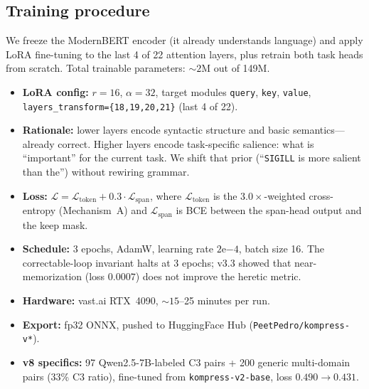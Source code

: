 \subsection{Training procedure}
\label{sec:train}

We freeze the ModernBERT encoder (it already understands language) and
apply LoRA fine-tuning to the last 4 of 22 attention layers, plus retrain
both task heads from scratch. Total trainable parameters: ${\sim}2$M out of
149M.

\begin{itemize}
  \item \textbf{LoRA config:} $r{=}16$, $\alpha{=}32$, target modules
        \texttt{query}, \texttt{key}, \texttt{value},
        \texttt{layers\_transform=\{18,19,20,21\}} (last 4 of 22).
  \item \textbf{Rationale:} lower layers encode syntactic structure and basic
        semantics---already correct. Higher layers encode task-specific
        salience: what is ``important'' for the current task. We shift that
        prior (``\texttt{SIGILL} is more salient than the'') without rewiring
        grammar.
  \item \textbf{Loss:} $\mathcal{L} = \mathcal{L}_{\mathrm{token}} + 0.3
        \cdot \mathcal{L}_{\mathrm{span}}$, where
        $\mathcal{L}_{\mathrm{token}}$ is the $3.0\times$-weighted
        cross-entropy (Mechanism~A) and $\mathcal{L}_{\mathrm{span}}$ is BCE
        between the span-head output and the keep mask.
  \item \textbf{Schedule:} 3 epochs, AdamW, learning rate $2\mathrm{e}{-4}$,
        batch size 16. The correctable-loop invariant halts at 3 epochs;
        v3.3 showed that near-memorization (loss $0.0007$) does not improve
        the heretic metric.
  \item \textbf{Hardware:} vast.ai RTX~4090, ${\sim}15$--25
        minutes per run.
  \item \textbf{Export:} fp32 ONNX, pushed to HuggingFace Hub
        (\texttt{PeetPedro/kompress-v*}).
  \item \textbf{v8 specifics:} 97 Qwen2.5-7B-labeled C3 pairs + 200 generic
        multi-domain pairs (33\% C3 ratio), fine-tuned from
        \texttt{kompress-v2-base}, loss $0.490\to0.431$.
\end{itemize}
